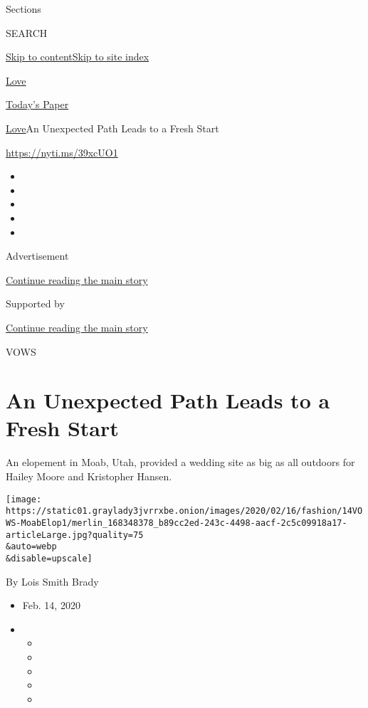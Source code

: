 Sections

SEARCH

\protect\hyperlink{site-content}{Skip to
content}\protect\hyperlink{site-index}{Skip to site index}

\href{https://www.nytimes3xbfgragh.onion/section/fashion/weddings}{Love}

\href{https://myaccount.nytimes3xbfgragh.onion/auth/login?response_type=cookie\&client_id=vi}{}

\href{https://www.nytimes3xbfgragh.onion/section/todayspaper}{Today's
Paper}

\href{/section/fashion/weddings}{Love}\textbar{}An Unexpected Path Leads
to a Fresh Start

\url{https://nyti.ms/39xcUO1}

\begin{itemize}
\item
\item
\item
\item
\item
\end{itemize}

Advertisement

\protect\hyperlink{after-top}{Continue reading the main story}

Supported by

\protect\hyperlink{after-sponsor}{Continue reading the main story}

VOWS

\hypertarget{an-unexpected-path-leads-to-a-fresh-start}{%
\section{An Unexpected Path Leads to a Fresh
Start}\label{an-unexpected-path-leads-to-a-fresh-start}}

An elopement in Moab, Utah, provided a wedding site as big as all
outdoors for Hailey Moore and Kristopher Hansen.

\texttt{[image: https://static01.graylady3jvrrxbe.onion/images/2020/02/16/fashion/14VOWS-MoabElop1/merlin\_168348378\_b89cc2ed-243c-4498-aacf-2c5c09918a17-articleLarge.jpg?quality=75\\\&auto=webp\\\&disable=upscale]}

By Lois Smith Brady

\begin{itemize}
\item
  Feb. 14, 2020
\item
  \begin{itemize}
  \item
  \item
  \item
  \item
  \item
  \end{itemize}
\end{itemize}

